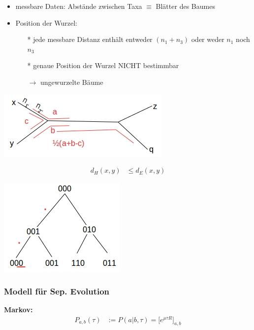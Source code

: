 \begin{itemize}
	\item messbare Daten: Abstände zwischen Taxa $\equiv$ Blätter des Baumes
	\item Position der Wurzel:
		\begin{itemize}
			\item[*] jede messbare Distanz enthält entweder $(n_1 + n_3)$ oder weder $n_1$ noch $n_3$
			\item[*] genaue Position der Wurzel NICHT bestimmbar
			\item[$\rightarrow$] ungewurzelte Bäume
		\end{itemize}
\end{itemize}

\begin{center}
	\includegraphics[scale=1]{lectures/161209/pix/pic2.jpg}		
\end{center}

\begin{align*}
	d_H (x,y) &\leq d_E (x,y)
\end{align*}

\begin{center}
	\includegraphics[scale=1]{lectures/161209/pix/pic3.jpg}
\end{center}

\newpage	

\subsubsection{Modell für Sep. Evolution}
\textbf{Markov:}
\begin{align*}
	P_{a,b}(\tau) &:= P(a | b, \tau) = \biggl[e^{\mu \tau R} \biggr]_{a,b}
\end{align*}

